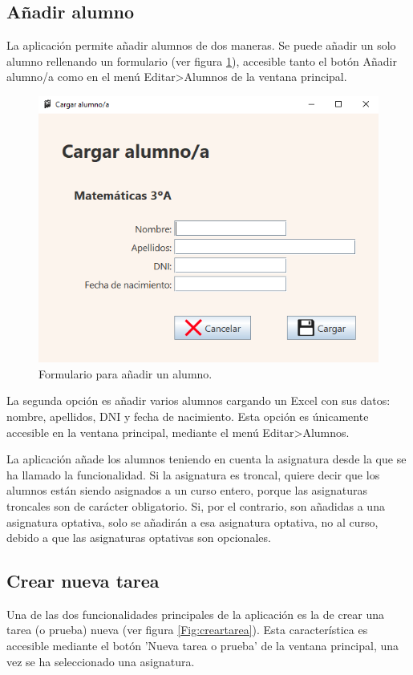 \subsection{Añadir alumno}
La aplicación permite añadir alumnos de dos maneras. Se puede añadir un solo alumno rellenando un formulario (ver figura \ref{Fig:añadiralumno}), accesible tanto el botón Añadir alumno/a como en el menú Editar>Alumnos de la ventana principal.

\begin{figure}[h]
\centering\includegraphics[width=0.5\linewidth]{figs/cargaralumno.png}
\caption{Formulario para añadir un alumno.}
\label{Fig:añadiralumno}
\end{figure}

La segunda opción es añadir varios alumnos cargando un Excel con sus datos: nombre, apellidos, DNI y fecha de nacimiento. Esta opción es únicamente accesible en la ventana principal, mediante el menú Editar>Alumnos.

La aplicación añade los alumnos teniendo en cuenta la asignatura desde la que se ha llamado la funcionalidad. Si la asignatura es troncal, quiere decir que los alumnos están siendo asignados a un curso entero, porque las asignaturas troncales son de carácter obligatorio. Si, por el contrario, son añadidas a una asignatura optativa, solo se añadirán a esa asignatura optativa, no al curso, debido a que las asignaturas optativas son opcionales.

\subsection{Crear nueva tarea}
Una de las dos funcionalidades principales de la aplicación es la de crear una tarea (o prueba) nueva (ver figura \ref{Fig:creartarea}). Esta característica es accesible mediante el botón 'Nueva tarea o prueba' de la ventana principal, una vez se ha seleccionado una asignatura.

